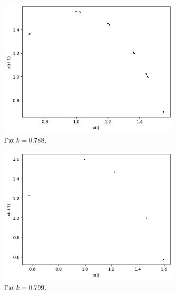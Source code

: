 \begin{figure}[h!]
	\centering
	\begin{subfigure}[b]{0.4\textwidth}
		\centering
		\includegraphics[width=\textwidth]{LateX images/graphs q16/g17}
		\caption{Για $k=0.788$.}
		\label{f:k88}
	\end{subfigure}
	\hfill
	\begin{subfigure}[b]{0.4\textwidth}
		\centering
		\includegraphics[width=\textwidth]{LateX images/graphs q16/g18}
		\caption{Για $k=0.799$.}
		\label{f:k89}
	\end{subfigure}
	\hfill
	\begin{subfigure}[b]{0.4\textwidth}
		\centering

\end{subfigure}
\end{figure}
